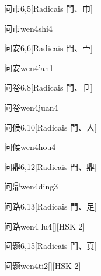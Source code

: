\begin{entry}{问市}{6,5}[Radicais ⾨、⼱]
  \begin{phonetics}{问市}{wen4shi4}
  \end{phonetics}
\end{entry}

\begin{entry}{问安}{6,6}[Radicais ⾨、⼧]
  \begin{phonetics}{问安}{wen4'an1}
  \end{phonetics}
\end{entry}

\begin{entry}{问卷}{6,8}[Radicais ⾨、⼙]
  \begin{phonetics}{问卷}{wen4juan4}
  \end{phonetics}
\end{entry}

\begin{entry}{问候}{6,10}[Radicais ⾨、⼈]
  \begin{phonetics}{问候}{wen4hou4}
  \end{phonetics}
\end{entry}

\begin{entry}{问鼎}{6,12}[Radicais ⾨、⿍]
  \begin{phonetics}{问鼎}{wen4ding3}
  \end{phonetics}
\end{entry}

\begin{entry}{问路}{6,13}[Radicais ⾨、⾜]
  \begin{phonetics}{问路}{wen4 lu4}[][HSK 2]
  \end{phonetics}
\end{entry}

\begin{entry}{问题}{6,15}[Radicais ⾨、⾴]
  \begin{phonetics}{问题}{wen4ti2}[][HSK 2]
  \end{phonetics}
\end{entry}

